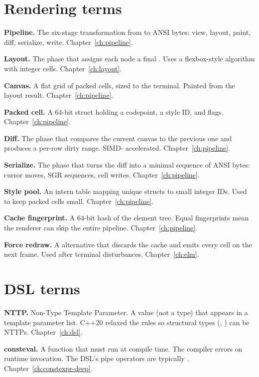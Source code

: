 \section{Rendering terms}

\textbf{Pipeline.} The six-stage transformation from
 to ANSI bytes: view, layout, paint, diff,
serialize, write. Chapter~\ref{ch:pipeline}.

\textbf{Layout.} The phase that assigns each node a final
. Uses a flexbox-style algorithm with integer cells.
Chapter~\ref{ch:layout}.

\textbf{Canvas.} A flat grid of packed cells, sized to the
terminal. Painted from the layout result. Chapter~\ref{ch:pipeline}.

\textbf{Packed cell.} A 64-bit struct holding a codepoint, a
style ID, and flags. Chapter~\ref{ch:pipeline}.

\textbf{Diff.} The phase that compares the current canvas to
the previous one and produces a per-row dirty range. SIMD-
accelerated. Chapter~\ref{ch:pipeline}.

\textbf{Serialize.} The phase that turns the diff into a
minimal sequence of ANSI bytes: cursor moves, SGR sequences,
cell writes. Chapter~\ref{ch:pipeline}.

\textbf{Style pool.} An intern table mapping unique
 structs to small integer IDs. Used to keep packed
cells small. Chapter~\ref{ch:pipeline}.

\textbf{Cache fingerprint.} A 64-bit hash of the element
tree. Equal fingerprints mean the renderer can skip the entire
pipeline. Chapter~\ref{ch:pipeline}.

\textbf{Force redraw.} A  alternative that discards
the cache and emits every cell on the next frame. Used after
terminal disturbances. Chapter~\ref{ch:elm}.

\section{DSL terms}

\textbf{NTTP.} Non-Type Template Parameter. A value (not a
type) that appears in a template parameter list. C++20
relaxed the rules so structural types (,
) can be NTTPs. Chapter~\ref{ch:dsl}.

\textbf{consteval.} A function that must run at compile time.
The compiler errors on runtime invocation. The DSL's pipe
operators are typically . Chapter~\ref{ch:constexpr-deep}.

